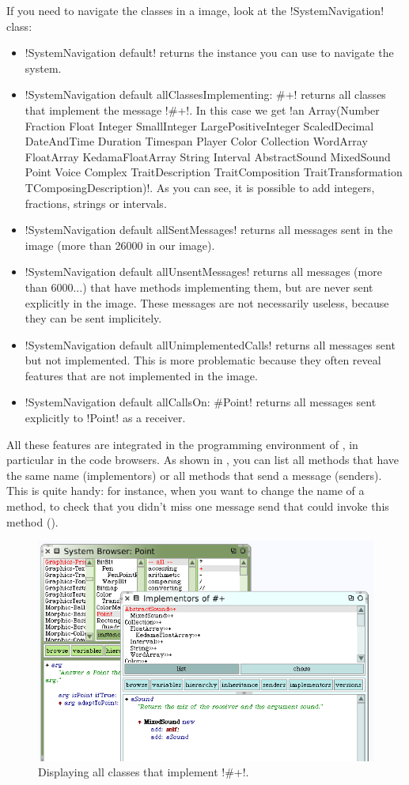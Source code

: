 \documentclass[a4paper,10pt,twoside]{book}
\begin{document}
If you need to navigate the classes in a \sq image, look at the \ct!SystemNavigation! class:
\begin{itemize}
	\item \ct!SystemNavigation default! returns the instance you can use to navigate the system.
	\item \ct!SystemNavigation default allClassesImplementing: #+! returns all classes that implement the message \ct!#+!.
	In this case we get \ct!an Array(Number Fraction Float Integer SmallInteger LargePositiveInteger ScaledDecimal DateAndTime Duration Timespan Player Color Collection WordArray FloatArray KedamaFloatArray String Interval AbstractSound MixedSound Point Voice Complex TraitDescription TraitComposition TraitTransformation TComposingDescription)!.
	As you can see, it is possible to add integers, fractions, strings or intervals.
	\item \ct!SystemNavigation default allSentMessages! returns all messages sent in the \sq image (more than 26000 in our image).
	\item \ct!SystemNavigation default allUnsentMessages! returns all messages (more than 6000...) that have methods implementing them, but are never sent explicitly in the image. These messages are not necessarily useless, because they can be sent implicitely.
	\item \ct!SystemNavigation default allUnimplementedCalls! returns all messages sent but not implemented.
	This is more problematic because they often reveal features that are not implemented in the image.
	\item \ct!SystemNavigation default allCallsOn: #Point! returns all messages sent explicitly to \ct!Point! as a receiver.
\end{itemize}

All these features are integrated in the programming environment of \sq, in particular in the code browsers.
As shown in , you can list all methods that have the same name (implementors) or all methods that send a message (senders).
This is quite handy: for instance, when you want to change the name of a method, to check that you didn't miss one message send that could invoke this method (). 

\begin{figure}[ht]\centering
	\includegraphics[width=.75\linewidth]{implementors}
	\caption{Displaying all classes that implement \ct!\#+!.\label{fig:implementors}}
\end{figure}
\end{document}
